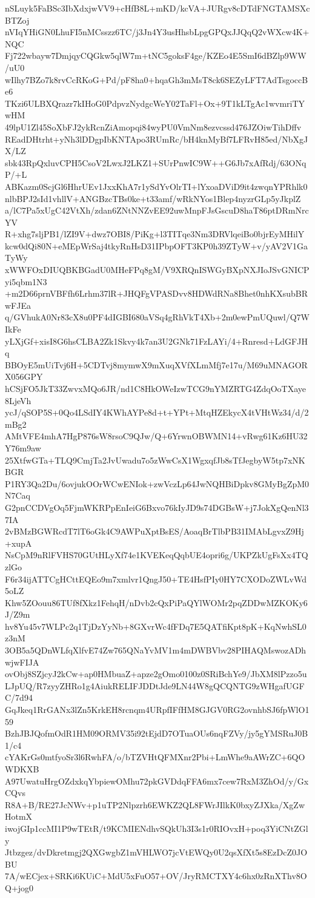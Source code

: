 nSLuyk5FaBSc3IbXdxjwVV9+cHfB8L+mKD/kcVA+JURgv8cDTdFNGTAMSXcBTZoj
nVIqYHiGN0LhuFI5nMCsszz6TC/j3Jn4Y3usHhsbLpgGPQxJJQqQ2vWXcw4K+NQC
Fj722wbayw7DmjqyCQGkw5qlW7m+tNC5goksF4ge/KZEo4E5SmI6dBZlp9WW/uU0
wIlhy7BZo7k8rvCcRKoG+Pd/pF8ha0+hqaGh3mMsT8ck6SEZyLFT7AdTsgoccBe6
TKzi6ULBXQrazr7kIHoG0PdpvzNydgcWeY02TaFl+Ox+9T1kLTgAc1wvmriTYwHM
49lpU1Zl45SoXbFJ2ykRcnZiAmopqi84wyPU0VmNm8ezvcssd476JZOiwTihDffv
REadDHtrht+yNh3lDDgpIbKNTApo3RUmRc/bH4knMyBf7LFRvH85ed/NbXgJX/LZ
sbk43RpQxluvCPH5CsoV2LwxJ2LKZ1+SUrPnwIC9W++G6Jb7xAfRdj/63ONqP/+L
ABKazm0ScjGl6HhrUEv1JxxKhA7r1ySdYvOlrTI+lYxoaDViD9it4zwqnYPRhlk0
nlbBPJ2sId1vhllV+ANGBzcTBs0ke+t33amf/wRkNYos1Blep4nyzrGLp5yJkplZ
a/lC7Pa5xUgC42VtXh/zdan6ZNtNNZvEE92uwMnpFJsGscuD8haT86ptDRmNrcYV
R+xhg7sljPB1/lZI9V+dwz7OBI8/PiKg+l3TITqe3Nm3DRVlqeiBo0bjrEyMHilY
kcw0dQi80N+eMEpWrSaj4tkyRnHsD31IPbpOFT3KP0h39ZTyW+v/yAV2V1GaTyWy
xWWFOxDIUQBKBGadU0MHeFPq8gM/V9XRQnISWGyBXpNXJIoJSvGNICPyi5qbm1N3
+m2D66prnVBFfh6Lrhm37lR+JHQFgVPASDvv8HDWdRNa8Bhet0nhKXsubBRwFJEa
q/GVhukA0Nr83cX8u0PF4dIGBI680aVSq4gRhVkT4Xb+2m0ewPmUQuwl/Q7WIkFe
yLXjGf+xisI8G6hsCLBA2Zk1Skvy4k7an3U2GNk71FzLAYi/4+Rnresd+LdGFJHq
BBOyE5mUiTvj6H+5CDTvj8mymwX9mXuqXVfXLmMfj7e17u/M69uMNAGORX056GPY
hCSjFO5JkT33ZwvxMQo6JR/nd1C8HkOWeIzwTCG9nYMZRTG4ZdqOoTXaye8LjeVh
ycJ/qSOP5S+0Qo4LSdIY4KWhAYPe8d+t+YPt+MtqHZEkycX4tVHtWz34/d/2mBg2
AMtVFE4mhA7HgP876sW8rsoC9QJw/Q+6YrwnOBWMN14+vRwg61Kz6HU32Y76m9aw
25XtfwGTa+TLQ9CmjTa2JvUwadu7o5zWwCsX1WgxqfJb8sTfJegbyW5tp7xNKBGR
P1RY3Qa2Du/6ovjukOOrWCwENIok+zwVczLp64JwNQHBiDpkv8GMyBgZpM0N7Caq
G2pnCCDVgOq5FjmWKRPpEnIeiG6Bxvo76kIyJD9s74DGBsW+j7JokXgQenNl37IA
2vBMzBGWRcdT7lT6oGk4C9AWPuXptBsES/AoaqBrTlbPB31IMAbLgvxZ9Hj+xupA
NsCpM9nRlFVHS70GUtHLyXf74e1KVEKeqQqbUE4opri6g/UKPZkUgFsXx4TQzlGo
F6r34ijATTCgHCttEQEo9m7xmlvr1QngJ50+TE4HsfPIy0HY7CXODoZWLvWd5oLZ
Khw5ZOouu86TUf8fXkz1FehqH/nDvb2cQxPiPaQYlWOMr2pqZDDwMZKOKy6J/Z9m
hv8Yu45v7WLPc2q1TjDzYyNb+8GXvrWc4fFDq7E5QATfiKpt8pK+KqNwhSL0z3nM
3OB5a5QDnWLfqXlfvE74Zw765QNaYvMV1m4mDWBVbv28PIHAQMswozADhwjwFIJA
ovObj8SZjcyJ2kCw+ap0HMbuaZ+apze2gOmo0100z0SRiBchYe9/JbXM8lPzzo5u
LJpUQ/R7zyyZHRo1g4AiukRELIFJDDtJde9LN44W8gQCQNTG9zWHgafUGFC/7d94
GqJkeq1RrGANx3lZn5KrkEH8rcnqm4URpfIFfHM8GJGV0RG2ovnhbSJ6fpWlO159
BzhJBJQofmOdR1HM09ORMV35i92tEjdD7OTuaOUs6nqFZVy/jy5gYMSRuJ0B1/c4
cYAKrGs0mtfyoSr3l6RwhFA/o/bTZVHtQFMXnr2Pbi+LmWhe9aAWrZC+6QOWDKXB
A97UwatuHrgOZdxkqYbpiewOMhu72pkGVDdqFFA6mx7cew7RxM3ZhOd/y/GxCQvs
R8A+B/RE27JcNWv+p1uTP2Nlpzrh6EWKZ2QL8FWrJIlkK0bxyZJXka/XgZwHotmX
iwojGIp1ccMI1P9wTEtR/t9KCMIENdhvSQkUh3I3s1r0RIOvxH+poq3YiCNtZGly
Jtbzgez/dvDkretmgj2QXGwgbZ1mVHLWO7jcVtEWQy0U2qsXfXt5s8EzDcZ0JOBU
7A/wECjex+SRKi6KUiC+MdU5xFuO57+OV/JryRMCTXY4c6hx0zRnXThv8OQ+jog0
